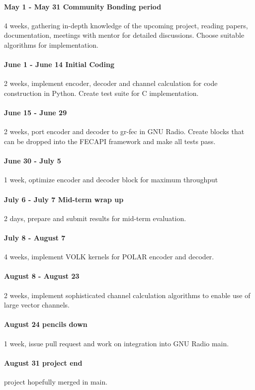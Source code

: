 \documentclass[a4paper,12pt]{scrartcl}
\def\CC{{C\nolinebreak[4]\hspace{-.05em}\raisebox{.4ex}{\tiny\textbf{++}}}}
\begin{document}
\paragraph{May 1 - May 31 Community Bonding period} 4 weeks, gathering in-depth knowledge of the upcoming project, reading papers, documentation, meetings with mentor for detailed discussions.
Choose suitable algorithms for implementation.
\paragraph{June 1 - June 14 Initial Coding} 2 weeks, implement encoder, decoder and channel calculation for code construction in Python.
Create test suite for \CC{} implementation.
\paragraph{June 15 - June 29} 2 weeks, port encoder and decoder to gr-fec in GNU Radio.
Create blocks that can be dropped into the FECAPI framework and make all tests pass.
\paragraph{June 30 - July 5} 1 week, optimize encoder and decoder block for maximum throughput
\paragraph{July 6 - July 7 Mid-term wrap up} 2 days, prepare and submit results for mid-term evaluation.
\paragraph{July 8 - August 7} 4 weeks, implement \ac{VOLK} kernels for POLAR encoder and decoder.
\paragraph{August 8 - August 23} 2 weeks, implement sophisticated channel calculation algorithms to enable use of large vector channels.
\paragraph{August 24 pencils down} 1 week, issue pull request and work on integration into GNU Radio main.
\paragraph{August 31 project end} project hopefully merged in main.
\end{document}
